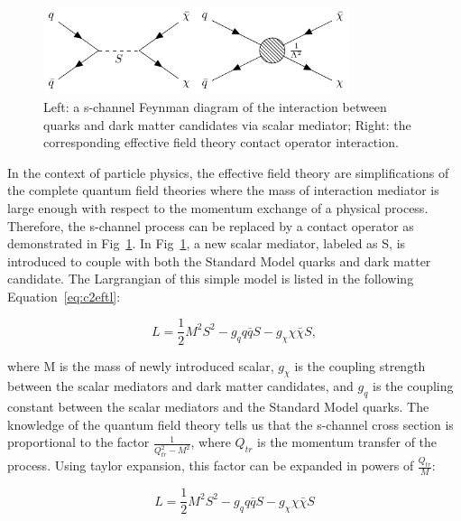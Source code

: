 \begin{figure}[htbp]
  \begin{center}
    \includegraphics[width=0.8\textwidth]{chapters/c2/figures/eft-feyn-diagram}
  \end{center}
  \caption{Left: a s-channel Feynman diagram of the interaction between quarks and dark matter candidates via scalar mediator; Right: the corresponding effective field theory contact operator interaction.}
  \label{fig:c2eftfeyndiagram}
\end{figure}

In the context of particle physics, the effective field theory are simplifications of the complete quantum field theories where the mass of interaction mediator is large enough with respect to the momentum exchange of a physical process. Therefore, the s-channel process can be replaced by a contact operator as demonstrated in Fig~\ref{fig:c2eftfeyndiagram}. In Fig~\ref{fig:c2eftfeyndiagram}, a new scalar mediator, labeled as S, is introduced to couple with both the Standard Model quarks and dark matter candidate. The Largrangian of this simple model is listed in the following Equation~\ref{eq:c2eftl}:

\begin{equation}
  L = \frac{1}{2}M^{2}S^{2}-g_{q}q\bar{q}S-g_{\chi}\chi\bar{\chi}S,
  \label{eq:c2eftl}
\end{equation}

where M is the mass of newly introduced scalar, $g_{\chi}$ is the coupling strength between the scalar mediators and dark matter candidates, and $g_{q}$ is the coupling constant between the scalar mediators and the Standard Model quarks. The knowledge of the quantum field theory tells us that the s-channel cross section is proportional to the factor $\frac{1}{Q_{tr}^{2}-M^{2}}$, where $Q_{tr}$ is the momentum transfer of the process. Using taylor expansion, this factor can be expanded in powers of $\frac{Q_{tr}}{M}$: 

\begin{equation}
  L = \frac{1}{2}M^{2}S^{2}-g_{q}q\bar{q}S-g_{\chi}\chi\bar{\chi}S
  \label{eq:c2taylorexp}
\end{equation}

